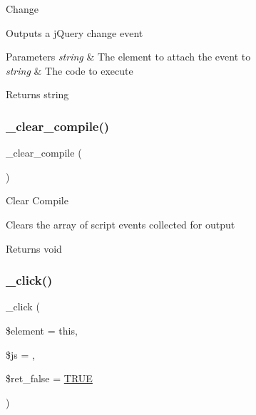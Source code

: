 Change

Outputs a j\+Query change event


\begin{DoxyParams}{Parameters}
{\em string} & The element to attach the event to \\
\hline
{\em string} & The code to execute \\
\hline
\end{DoxyParams}
\begin{DoxyReturn}{Returns}
string 
\end{DoxyReturn}
\mbox{\label{class_c_i___jquery_a8508147ee3b37f58e7c58f365c6c1409}} 
\subsubsection{\texorpdfstring{\+\_\+clear\+\_\+compile()}{\_clear\_compile()}}
{\footnotesize\ttfamily \+\_\+clear\+\_\+compile (\begin{DoxyParamCaption}{ }\end{DoxyParamCaption})\hspace{0.3cm}{\ttfamily [protected]}}

Clear Compile

Clears the array of script events collected for output

\begin{DoxyReturn}{Returns}
void 
\end{DoxyReturn}
\mbox{\label{class_c_i___jquery_a39604f0f7f540f32ea0c552e58322b5f}} 
\subsubsection{\texorpdfstring{\+\_\+click()}{\_click()}}
{\footnotesize\ttfamily \+\_\+click (\begin{DoxyParamCaption}\item[{}]{\$element = {\ttfamily \textquotesingle{}this\textquotesingle{}},  }\item[{}]{\$js = {\ttfamily \textquotesingle{}\textquotesingle{}},  }\item[{}]{\$ret\+\_\+false = {\ttfamily \mbox{\hyperlink{constants_8php_ae04a3efe6aa42044f803ee90c2277846}{T\+R\+UE}}} }\end{DoxyParamCaption})\hspace{0.3cm}{\ttfamily [protected]}}

